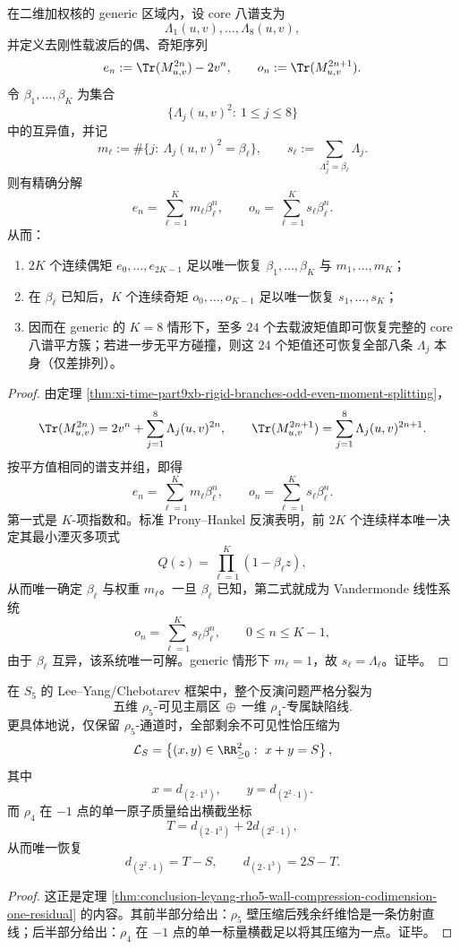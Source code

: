 \begin{theorem}[去刚性载波后的平方谱有限采样定理]\label{thm:conclusion-decoupled-square-spectrum-finite-sampling}
在二维加权核的 generic 区域内，设 core 八谱支为
\[
\Lambda_1(u,v),\dots,\Lambda_8(u,v),
\]
并定义去刚性载波后的偶、奇矩序列
\[
e_n:=\Tr(M_{u,v}^{2n})-2v^n,
\qquad
o_n:=\Tr(M_{u,v}^{2n+1}).
\]
令 \(\beta_1,\dots,\beta_K\) 为集合
\[
\{\Lambda_j(u,v)^2:\ 1\le j\le 8\}
\]
中的互异值，并记
\[
m_\ell:=\#\{j:\ \Lambda_j(u,v)^2=\beta_\ell\},
\qquad
s_\ell:=\sum_{\Lambda_j^2=\beta_\ell}\Lambda_j.
\]
则有精确分解
\[
e_n=\sum_{\ell=1}^{K}m_\ell\beta_\ell^n,
\qquad
o_n=\sum_{\ell=1}^{K}s_\ell\beta_\ell^n.
\]
从而：
\begin{enumerate}
\normalfont
  \item \(2K\) 个连续偶矩 \(e_0,\dots,e_{2K-1}\) 足以唯一恢复 \(\beta_1,\dots,\beta_K\) 与 \(m_1,\dots,m_K\)；
  \item 在 \(\beta_\ell\) 已知后，\(K\) 个连续奇矩 \(o_0,\dots,o_{K-1}\) 足以唯一恢复 \(s_1,\dots,s_K\)；
  \item 因而在 generic 的 \(K=8\) 情形下，至多 \(24\) 个去载波矩值即可恢复完整的 core 八谱平方簇；若进一步无平方碰撞，则这 \(24\) 个矩值还可恢复全部八条 \(\Lambda_j\) 本身（仅差排列）。
\end{enumerate}
\end{theorem}
\begin{proof}
由定理 \ref{thm:xi-time-part9xb-rigid-branches-odd-even-moment-splitting}，
\[
\Tr(M_{u,v}^{2n})=2v^n+\sum_{j=1}^{8}\Lambda_j(u,v)^{2n},
\qquad
\Tr(M_{u,v}^{2n+1})=\sum_{j=1}^{8}\Lambda_j(u,v)^{2n+1}.
\]
按平方值相同的谱支并组，即得
\[
e_n=\sum_{\ell=1}^{K}m_\ell\beta_\ell^n,
\qquad
o_n=\sum_{\ell=1}^{K}s_\ell\beta_\ell^n.
\]
第一式是 \(K\)-项指数和。标准 Prony--Hankel 反演表明，前 \(2K\) 个连续样本唯一决定其最小湮灭多项式
\[
Q(z)=\prod_{\ell=1}^{K}(1-\beta_\ell z),
\]
从而唯一确定 \(\beta_\ell\) 与权重 \(m_\ell\)。一旦 \(\beta_\ell\) 已知，第二式就成为 Vandermonde 线性系统
\[
o_n=\sum_{\ell=1}^{K}s_\ell\beta_\ell^n,
\qquad 0\le n\le K-1,
\]
由于 \(\beta_\ell\) 互异，该系统唯一可解。generic 情形下 \(m_\ell=1\)，故 \(s_\ell=\Lambda_\ell\)。证毕。
\end{proof}

\begin{corollary}\label{cor:conclusion-s5-leyang-codimension-one-defect-line}
在 \(S_5\) 的 Lee--Yang/Chebotarev 框架中，整个反演问题严格分裂为
\[
\text{五维 }\rho_5\text{-可见主扇区}
\ \oplus\
\text{一维 }\rho_4\text{-专属缺陷线}.
\]
更具体地说，仅保留 \(\rho_5\)-通道时，全部剩余不可见性恰压缩为
\[
\mathcal L_S
=
\left\{
(x,y)\in\RR_{\ge 0}^2:\ x+y=S
\right\},
\]
其中
\[
x=d_{(2\cdot 1^3)},
\qquad
y=d_{(2^2\cdot 1)}.
\]
而 \(\rho_4\) 在 \(-1\) 点的单一原子质量给出横截坐标
\[
T=d_{(2\cdot 1^3)}+2d_{(2^2\cdot 1)},
\]
从而唯一恢复
\[
d_{(2^2\cdot1)}=T-S,
\qquad
d_{(2\cdot1^3)}=2S-T.
\]
\end{corollary}
\begin{proof}
这正是定理 \ref{thm:conclusion-leyang-rho5-wall-compression-codimension-one-residual} 的内容。其前半部分给出：\(\rho_5\) 壁压缩后残余纤维恰是一条仿射直线；后半部分给出：\(\rho_4\) 在 \(-1\) 点的单一标量横截足以将其压缩为一点。证毕。
\end{proof}

